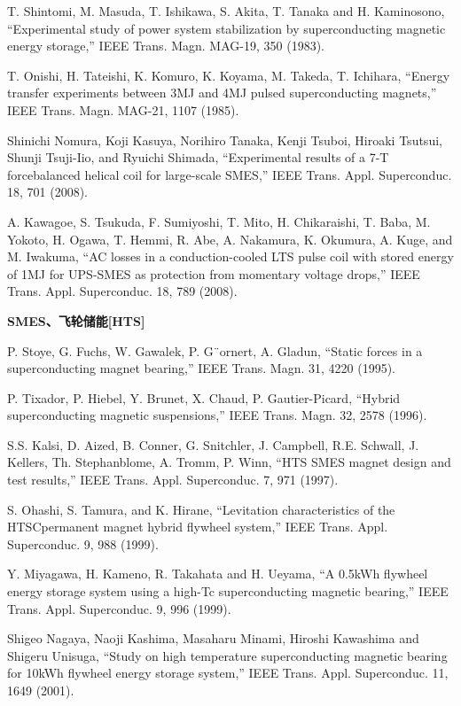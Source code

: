 \noindent [9.77] T. Shintomi, M. Masuda, T. Ishikawa, S. Akita, T. Tanaka and H. Kaminosono,
``Experimental study of power system stabilization by superconducting magnetic
energy storage,” IEEE Trans. Magn. MAG-19, 350 (1983).

\noindent [9.78] T. Onishi, H. Tateishi, K. Komuro, K. Koyama, M. Takeda, T. Ichihara, ``Energy
transfer experiments between 3MJ and 4MJ pulsed superconducting magnets,”
IEEE Trans. Magn. MAG-21, 1107 (1985).

\noindent [9.79] Shinichi Nomura, Koji Kasuya, Norihiro Tanaka, Kenji Tsuboi, Hiroaki Tsutsui,
Shunji Tsuji-Iio, and Ryuichi Shimada, ``Experimental results of a 7-T forcebalanced
helical coil for large-scale SMES,” IEEE Trans. Appl. Superconduc. 18,
701 (2008).

\noindent [9.80] A. Kawagoe, S. Tsukuda, F. Sumiyoshi, T. Mito, H. Chikaraishi, T. Baba, M. Yokoto,
H. Ogawa, T. Hemmi, R. Abe, A. Nakamura, K. Okumura, A. Kuge, and M.
Iwakuma, ``AC losses in a conduction-cooled LTS pulse coil with stored energy of
1MJ for UPS-SMES as protection from momentary voltage drops,” IEEE Trans.
Appl. Superconduc. 18, 789 (2008).

\noindent \textbf{SMES、飞轮储能[HTS] }

\noindent [9.81] P. Stoye, G. Fuchs, W. Gawalek, P. G¨ornert, A. Gladun, ``Static forces in a superconducting
magnet bearing,” IEEE Trans. Magn. 31, 4220 (1995).

\noindent [9.82] P. Tixador, P. Hiebel, Y. Brunet, X. Chaud, P. Gautier-Picard, ``Hybrid superconducting
magnetic suspensions,” IEEE Trans. Magn. 32, 2578 (1996).

\noindent [9.83] S.S. Kalsi, D. Aized, B. Conner, G. Snitchler, J. Campbell, R.E. Schwall, J. Kellers,
Th. Stephanblome, A. Tromm, P. Winn, ``HTS SMES magnet design and test
results,” IEEE Trans. Appl. Superconduc. 7, 971 (1997).

\noindent [9.84] S. Ohashi, S. Tamura, and K. Hirane, ``Levitation characteristics of the HTSCpermanent
magnet hybrid flywheel system,” IEEE Trans. Appl. Superconduc. 9,
988 (1999).

\noindent [9.85] Y. Miyagawa, H. Kameno, R. Takahata and H. Ueyama, ``A 0.5kWh flywheel
energy storage system using a high-Tc superconducting magnetic bearing,” IEEE
Trans. Appl. Superconduc. 9, 996 (1999).

\noindent [9.86] Shigeo Nagaya, Naoji Kashima, Masaharu Minami, Hiroshi Kawashima and
Shigeru Unisuga, ``Study on high temperature superconducting magnetic bearing
for 10kWh flywheel energy storage system,” IEEE Trans. Appl. Superconduc.
11, 1649 (2001).

